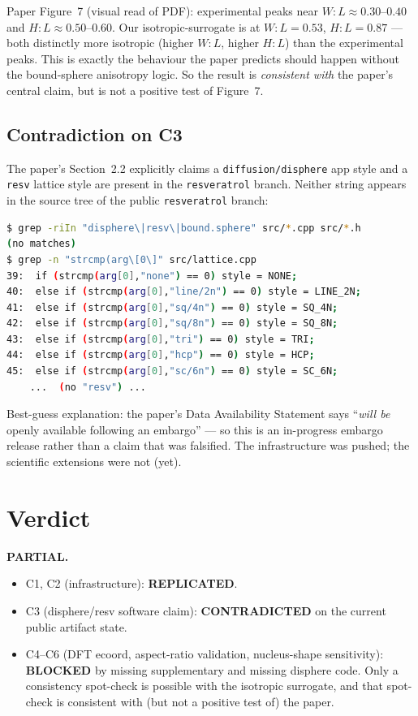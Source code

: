 \documentclass[11pt]{article}
\begin{document}
Paper Figure~7 (visual read of PDF): experimental peaks near $W\!:\!L \approx 0.30$--$0.40$ and $H\!:\!L \approx 0.50$--$0.60$. Our isotropic-surrogate is at $W\!:\!L=0.53$, $H\!:\!L=0.87$ --- both distinctly more isotropic (higher $W\!:\!L$, higher $H\!:\!L$) than the experimental peaks. This is exactly the behaviour the paper predicts should happen without the bound-sphere anisotropy logic. So the result is \emph{consistent with} the paper's central claim, but is not a positive test of Figure~7.

\subsection{Contradiction on C3}

The paper's Section~2.2 explicitly claims a \texttt{diffusion/disphere} app style and a \texttt{resv} lattice style are present in the \texttt{resveratrol} branch. Neither string appears in the source tree of the public \texttt{resveratrol} branch:

\begin{lstlisting}[caption={grep of the public resveratrol branch source},language=bash]
$ grep -riIn "disphere\|resv\|bound.sphere" src/*.cpp src/*.h
(no matches)
$ grep -n "strcmp(arg\[0\]" src/lattice.cpp
39:  if (strcmp(arg[0],"none") == 0) style = NONE;
40:  else if (strcmp(arg[0],"line/2n") == 0) style = LINE_2N;
41:  else if (strcmp(arg[0],"sq/4n") == 0) style = SQ_4N;
42:  else if (strcmp(arg[0],"sq/8n") == 0) style = SQ_8N;
43:  else if (strcmp(arg[0],"tri") == 0) style = TRI;
44:  else if (strcmp(arg[0],"hcp") == 0) style = HCP;
45:  else if (strcmp(arg[0],"sc/6n") == 0) style = SC_6N;
    ...  (no "resv") ...
\end{lstlisting}

Best-guess explanation: the paper's Data Availability Statement says ``\emph{will be} openly available following an embargo'' --- so this is an in-progress embargo release rather than a claim that was falsified. The infrastructure was pushed; the scientific extensions were not (yet).

\section{Verdict}

\textbf{PARTIAL.}

\begin{itemize}
  \item C1, C2 (infrastructure): \textbf{REPLICATED}.
  \item C3 (disphere/resv software claim): \textbf{CONTRADICTED} on the current public artifact state.
  \item C4--C6 (DFT ecoord, aspect-ratio validation, nucleus-shape sensitivity): \textbf{BLOCKED} by missing supplementary and missing disphere code. Only a consistency spot-check is possible with the isotropic surrogate, and that spot-check is consistent with (but not a positive test of) the paper.
\end{itemize}
\end{document}
